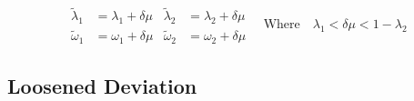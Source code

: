   \begin{equation}
  \begin{aligned}
   \widetilde{\lambda}_1 & = \lambda_1 + \delta\mu &  \widetilde{\lambda}_2 & = \lambda_2 + \delta\mu \\
   \widetilde{\omega}_1 & = \omega_1 + \delta\mu &  \widetilde{\omega}_2 & = \omega_2 + \delta\mu 
  \end{aligned} \quad \text{Where} \quad \lambda_1 < \delta\mu < 1 - \lambda_2
  \end{equation}
  
  \subsection{Loosened Deviation}\label{sec:LoosenedDeviation}
  
